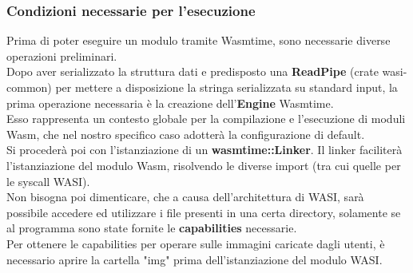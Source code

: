 \subsubsection{Condizioni necessarie per l'esecuzione}
Prima di poter eseguire un modulo tramite Wasmtime, sono necessarie diverse operazioni preliminari.
\\Dopo aver serializzato la struttura dati e predisposto una \textbf{ReadPipe} (crate wasi-common) per mettere a disposizione la stringa serializzata su standard input, la prima operazione necessaria è la creazione dell'\textbf{Engine} Wasmtime.
\\Esso rappresenta un contesto globale per la compilazione e l'esecuzione di moduli Wasm, che nel nostro specifico caso adotterà la configurazione di default.
\\Si procederà poi con l'istanziazione di un \textbf{wasmtime::Linker}. Il linker faciliterà l'istanziazione del modulo Wasm, risolvendo le diverse import (tra cui quelle per le syscall WASI).
\\Non bisogna poi dimenticare, che a causa dell'architettura di WASI, sarà possibile accedere ed utilizzare i file presenti in una certa directory, solamente se al programma sono state fornite le \textbf{capabilities} necessarie. 
\\Per ottenere le capabilities per operare sulle immagini caricate dagli utenti, è necessario aprire la cartella "img" prima dell'istanziazione del modulo WASI.

